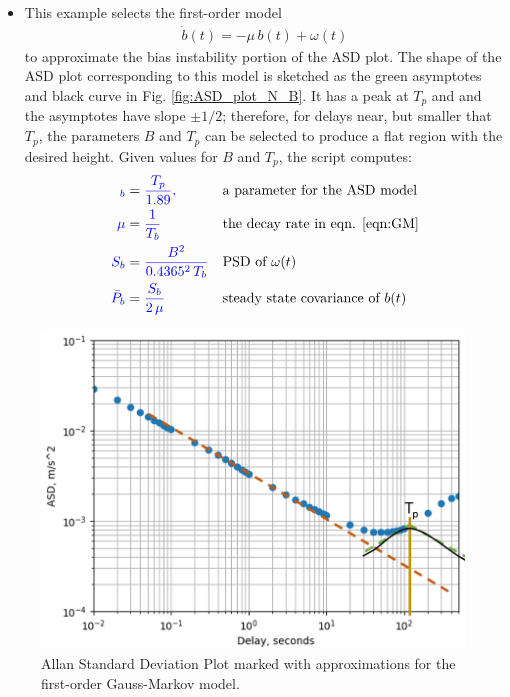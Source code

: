 \documentclass[letter,twocolumn]{article}
\begin{document}
\begin{enumerate}
\begin{itemize}
		\item This example selects the first-order model 
		\begin{align} \label{eqn:GM}
			\dot{b}(t) = -\mu \, b(t) + \omega(t)
		\end{align}
		to approximate the bias instability portion of the ASD plot. 
		The shape of the ASD plot corresponding to this model is sketched as the green asymptotes and black curve in Fig. \ref{fig:ASD_plot_N_B}. 
		It has a peak at $T_p$ and and the asymptotes have slope $\pm 1/2$;
		therefore, for delays near, but smaller that $T_p$, the parameters $B$ and $T_p$ can be selected to produce a flat region with the desired height. 
		Given values for $B$ and $T_p$, the script computes:
		\begin{align*}
		\blue \T_b &= \blue \frac{T_p}{1.89}, \black && \mbox{a parameter for the ASD model} \\
		\blue \mu &= \blue\frac{1}{T_b} \black  && \mbox{the decay rate in eqn. \eqref{eqn:GM}} \\
		\blue S_b &= \blue\frac{B^2}{0.4365^2\,T_b} \black && \mbox{PSD of } \omega(t) \\
		\blue \bar{P}_b & = \blue\frac{S_b}{2\,\mu} \black && \mbox{steady state covariance of } b(t) 
		\end{align*}
	\end{itemize}

\end{enumerate}

\begin{figure}[tbh]
	\centering
	\includegraphics[trim=0in 0in 0in 0.1in, clip, width=0.8\columnwidth]{figure/ASD_plot_B_GM}
	\caption{Allan Standard Deviation Plot marked with approximations for the first-order Gauss-Markov model. }
	\label{fig:ASD_plot_B_GM}
\end{figure}
\end{document}
